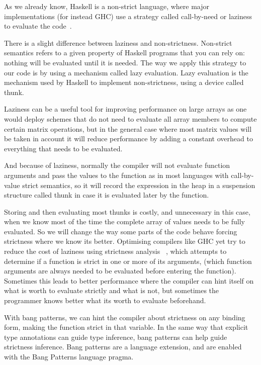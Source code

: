 \documentclass{tmr}
\begin{document}
As we already know, Haskell is a non-strict language, where major implementations (for instead GHC)
use a strategy called call-by-need or laziness to evaluate the code~\cite{Laziness}. 

There is a slight difference between laziness and non-strictness. Non-strict
semantics refers to a given property of Haskell programs that you can rely on: 
nothing will be evaluated until it is needed. The way we apply this strategy to 
our code is by using a mechanism called lazy evaluation. Lazy evaluation is the 
mechanism used by Haskell to implement non-strictness, using a device called thunk. 

Laziness can be a useful tool for improving performance on large arrays as one would deploy
schemes that do not need to evaluate all array members to compute certain matrix operations,
but in the general case where most matrix values will be taken in account it will 
reduce performance by adding a constant overhead to everything that needs to be evaluated.

And because of laziness, normally the compiler will not evaluate function arguments and pass 
the values to the function as in most languages with call-by-value strict semantics, 
so it will record the expression in the heap in a suspension structure called thunk in case it is 
evaluated later by the function. 

Storing and then evaluating most thunks is costly, and unnecessary in this case, when we know 
most of the time the complete array of values needs to be fully evaluated. So we will change the
way some parts of the code behave forcing strictness where we know its better.
Optimising compilers like GHC yet try to reduce the cost of laziness using strictness analysis
 ~\cite{Strictness}, which attempts to determine if a function is strict in one or more of 
its arguments, (which function arguments are always needed to be evaluated before entering the function). 
Sometimes this leads to better performance where the compiler can hint itself on what is worth to evaluate
strictly and what is not, but sometimes the programmer knows better what its worth 
to evaluate beforehand.

With bang patterns, we can hint the compiler about strictness on any binding form, 
making the function strict in that variable. In the same way that explicit type annotations can 
guide type inference, bang patterns can help guide strictness inference. Bang patterns 
are a language extension, and are enabled with the Bang Patterns language pragma.
\end{document}
